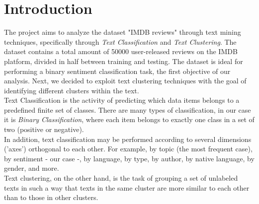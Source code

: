 \documentclass[fleqn,10pt]{SelfArx} %
\affiliation{\textbf{University}: University of Milan-Bicocca} %
\begin{document}
\maketitle %

\tableofcontents %

\thispagestyle{empty} %


\section{Introduction}
The project aims to analyze the dataset "IMDB reviews" through text mining techniques, specifically through \textit{Text Classification} and \textit{Text Clustering}. The dataset contains a total amount of 50000 user-released reviews on the IMDB platform, divided in half between training and testing. The dataset is ideal for performing a binary sentiment classification task, the first objective of our analysis. Next, we decided to exploit text clustering techniques with the goal of identifying different clusters within the text.\\
Text Classification is the activity of predicting which data items belongs to a predefined finite set of classes. There are many types of classification, in our case it is \textit{Binary Classification}, where each item belongs to exactly one class in a set of two (positive or negative).\\
In addition, text classification may be performed according to several dimensions ('axes') orthogonal to each other. For example, by topic (the most frequent case), by sentiment - our case -, by language, by type, by author, by native language, by gender, and more.\\
Text clustering, on the other hand, is the task of grouping a set of unlabeled texts in such a way that texts in the same cluster are more similar to each other than to those in other clusters.
\end{document}
